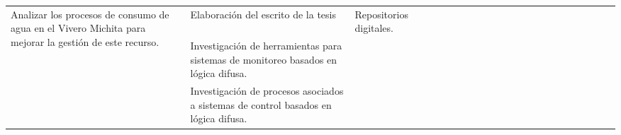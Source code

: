 \begin{landscape}
\begin{ThreePartTable}
\begin{longtable}{|p{}|p{5.5cm}|p{5.5cm}|l|l|l|l|l|l|l|l|l|l|l|l|l|l|l|l|l|l|l|}
      \hline
      \multirow{3}{0.28 \textwidth}{Analizar los procesos de consumo de agua en el Vivero Michita para mejorar la gestión de este recurso.}                                                    & Elaboración del escrito de la tesis                                                        & Repositorios digitales.                                                                                           & \cellcolor{magenta!70}                & \cellcolor{magenta!70}                & \cellcolor{magenta!70}                & \cellcolor{magenta!70}                & \cellcolor{magenta!70} & \cellcolor{magenta!70} & \cellcolor{magenta!70} & \cellcolor{magenta!70} & \cellcolor{magenta!70} & \cellcolor{magenta!70} & \cellcolor{magenta!70} & \cellcolor{magenta!70} & \cellcolor{magenta!70} & \cellcolor{magenta!70} &                        \\
      \cline{2-2}\cline{4-21}
                                                                                                                                                                                               & Investigación de herramientas para sistemas de monitoreo basados en lógica difusa.         &                                                                                                                   & \cellcolor{magenta!70}                &                                       &                                       &                                       &                        &                        &                        &                        &                        &                        &                        &                        &                        &                        &                        \\
      \cline{2-2}\cline{4-21}
                                                                                                                                                                                               & Investigación de procesos asociados a sistemas de control basados en lógica difusa.        &                                                                                                                   & \cellcolor{magenta!70}                &                                       &                                       &                                       &                        &                        &                        &                        &                        &                        &                        &                        &                        &                        &                        \\

\end{longtable}
\end{ThreePartTable}
\end{landscape}
